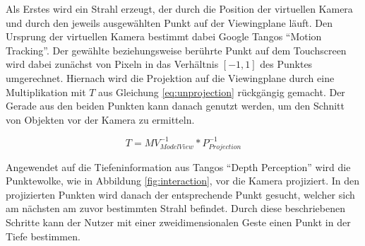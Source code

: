 Als Erstes wird ein Strahl erzeugt, der durch die Position der virtuellen Kamera und durch den jeweils ausgewählten Punkt auf der Viewingplane läuft. Den Ursprung der virtuellen Kamera bestimmt dabei Google Tangos \enquote{Motion Tracking}. Der gewählte beziehungsweise berührte Punkt auf dem Touchscreen wird dabei zunächst von Pixeln in das Verhältnis \(\left[-1,1\right]\) des Punktes umgerechnet. Hiernach wird die Projektion auf die Viewingplane durch eine Multiplikation mit \(T\) aus Gleichung \ref{eq:unprojection} rückgängig gemacht. Der Gerade aus den beiden Punkten kann danach genutzt werden, um den Schnitt von Objekten vor der Kamera zu ermitteln. \citep{OpenG86:online} 

\begin{equation} \label{eq:unprojection}
T  = MV_{ModelView}^{-1} * P_{Projection}^{-1}
\end{equation}

Angewendet auf die Tiefeninformation aus Tangos \enquote{Depth Perception} wird die Punktewolke, wie in Abbildung \ref{fig:interaction}, vor die Kamera projiziert. In den projizierten Punkten wird danach der entsprechende Punkt gesucht, welcher sich am nächsten am zuvor bestimmten Strahl befindet. Durch diese beschriebenen Schritte kann der Nutzer mit einer zweidimensionalen Geste einen Punkt in der Tiefe bestimmen.

